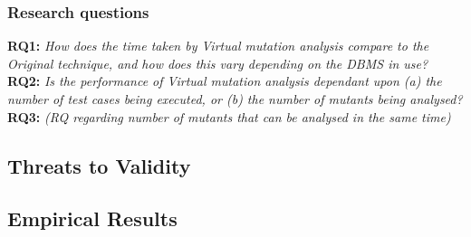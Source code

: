 \subsubsection{Research questions}

\textbf{RQ1: }\emph{How does the time taken by Virtual mutation analysis compare to the Original technique, and how does
this vary depending on the DBMS in use?}\\

\textbf{RQ2: }\emph{Is the performance of Virtual mutation analysis dependant upon (a) the number of test cases being
executed, or (b) the number of mutants being analysed?}\\

\textbf{RQ3: }\emph{(RQ regarding number of mutants that can be analysed in the same time)}\\

\subsection{Threats to Validity}

\subsection{Empirical Results}





